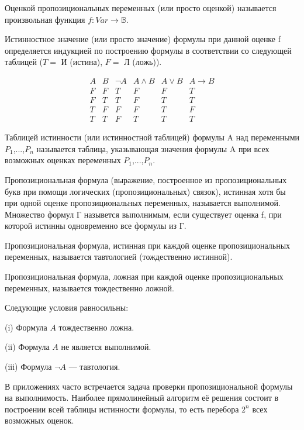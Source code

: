\begin{definition}
Оценкой пропозициональных переменных (или просто оценкой) называется произвольная функция $f: Var \to \mathbb{B}$.
\end{definition}

\begin{definition}
Истинностное значение (или просто значение) формулы при данной оценке f определяется индукцией по построению формулы в соответствии со следующей таблицей ($T =$ И (истина), $F =$ Л (ложь)).

$$
\begin{array}{cc|c|c|c|c}
{A} & {B} & {\neg A} & {A \wedge B} & {A \vee B} & {A \rightarrow B} \\
\hline F & F & T & F & F & T \\
F & T & T & F & T & T \\
T & F & F & F & T & F \\
T & T & F & T & T & T 
\end{array}
$$

\end{definition}

\begin{definition}
Таблицей истинности (или истинностной таблицей) формулы A над переменными $P_1$,...,$P_n$ называется таблица,
указывающая значения формулы A при всех возможных оценках переменных $P_1$,...,$P_n$.
\end{definition}

\begin{definition}
	Пропозициональная формула (выражение, построенное из пропозициональных букв при помощи логических
	(пропозициональных) связок), истинная хотя бы при одной оценке пропозициональных переменных, называется
	выполнимой. Множество формул Г назывется выполнимым, если существует оценка f, при которой истинны одновременно
	все формулы из Г.
\end{definition}

\begin{definition}
Пропозициональная формула, истинная при каждой оценке пропозициональных переменных, называется тавтологией
(тождественно истинной).
\end{definition}

\begin{definition}
Пропозициональная формула, ложная при каждой
оценке пропозициональных переменных, называется тождественно ложной.
\end{definition}

\begin{proposition}
Следующие условия равносильны:

(i) Формула $A$ тождественно ложна.

(ii) Формула $A$ не является выполнимой.

(iii) Формула $\lnot A$ — тавтология.
\end{proposition}

\begin{definition}
В приложениях часто встречается задача проверки пропозициональной формулы на выполнимость. Наиболее прямолинейный алгоритм её решения состоит в построении всей таблицы истинности формулы, то есть перебора $2^n$ всех возможных оценок.
\end{definition}
